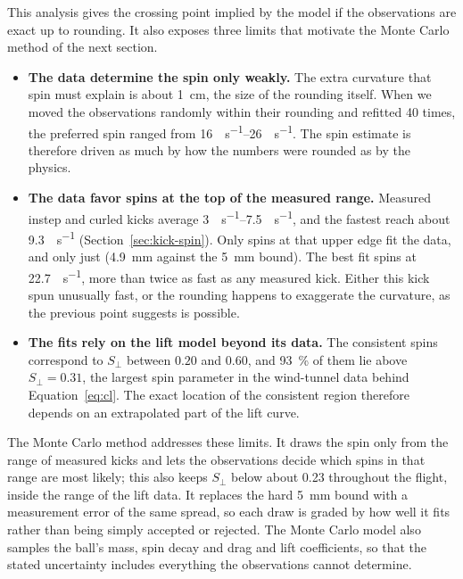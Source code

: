\documentclass[10pt,a4paper]{article}
\begin{document}
This analysis gives the crossing point implied by the model if the
observations are exact up to rounding. It also exposes three limits that
motivate the Monte Carlo method of the next section.
\begin{itemize}
  \item \textbf{The data determine the spin only weakly.} The extra curvature
    that spin must explain is about \SI{1}{\centi\metre}, the size of the
    rounding itself. When we moved the observations randomly within their
    rounding and refitted 40 times, the preferred spin ranged from
    \SIrange{16}{26}{\rev\per\second}. The spin estimate is therefore driven
    as much by how the numbers were rounded as by the physics.
  \item \textbf{The data favor spins at the top of the measured range.}
    Measured instep and curled kicks average \SIrange{3}{7.5}{\rev\per\second},
    and the fastest reach about \SI{9.3}{\rev\per\second}
    (Section~\ref{sec:kick-spin}). Only spins at that upper edge fit the
    data, and only just (\SI{4.9}{\milli\metre} against the
    \SI{5}{\milli\metre} bound). The best fit spins at
    \SI{22.7}{\rev\per\second}, more than twice as fast as any measured kick.
    Either this kick spun unusually fast, or the rounding happens to
    exaggerate the curvature, as the previous point suggests is possible.
  \item \textbf{The fits rely on the lift model beyond its data.} The
    consistent spins correspond to $S_\perp$ between $0.20$ and $0.60$, and
    \SI{93}{\percent} of them lie above $S_\perp = 0.31$, the largest spin
    parameter in the wind-tunnel data behind Equation~\eqref{eq:cl}. The exact
    location of the consistent region therefore depends on an extrapolated
    part of the lift curve.
\end{itemize}
The Monte Carlo method addresses these limits. It draws the spin only from
the range of measured kicks and lets the observations decide which spins in
that range are most likely; this also keeps $S_\perp$ below about 0.23
throughout the flight, inside the range of the lift data. It replaces the hard \SI{5}{\milli\metre} bound with
a measurement error of the same spread, so each draw is graded by how well it
fits rather than being simply accepted or rejected. The Monte Carlo model also samples the ball's mass, spin
decay and drag and lift coefficients, so that the stated uncertainty includes
everything the observations cannot determine.

\end{document}
